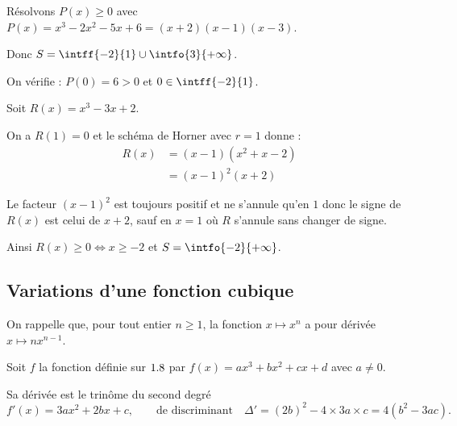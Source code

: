 \begin{ex}
	Résolvons $P(x) \geq 0$ avec $P(x) = x^3 - 2x^2 - 5x + 6 = (x + 2)(x - 1)(x - 3)$.
	\begin{center}
	\end{center}
	Donc $S = \intff{-2}{1} \cup \intfo{3}{+\infty}$.

	On vérifie : $P(0) = 6 > 0$ et $0 \in \intff{-2}{1}$.
\end{ex}

\begin{ex}
	Soit $R(x) = x^3 - 3x + 2$.

	On a $R(1) = 0$ et le schéma de Horner avec $r = 1$ donne :
	\[
		\begin{aligned}
			R(x) & = (x - 1)(x^2 + x - 2) \\
			     & = (x - 1)^2(x + 2)
		\end{aligned}
	\]

	Le facteur $(x - 1)^2$ est toujours positif et ne s'annule qu'en $1$ donc le signe de $R(x)$ est celui de $x + 2$, sauf en $x = 1$ où $R$ s'annule sans changer de signe.

	\begin{center}
	\end{center}

	Ainsi $R(x) \geq 0 \iff x \geq -2$ et $S = \intfo{-2}{+\infty}$.
\end{ex}

\subsection{Variations d'une fonction cubique}

On rappelle que, pour tout entier $n \geq 1$, la fonction $x \mapsto x^n$ a pour dérivée $x \mapsto n x^{n-1}$.

\begin{prop}
	Soit $f$ la fonction définie sur $1.8$ par $f(x) = ax^3 + bx^2 + cx + d$ avec $a \neq 0$.

	Sa dérivée est le trinôme du second degré
	\[
		f'(x) = 3ax^2 + 2bx + c, \qquad \text{de discriminant} \quad \Delta' = (2b)^2 - 4 \times 3a \times c = 4(b^2 - 3ac).
	\]
\end{prop}


